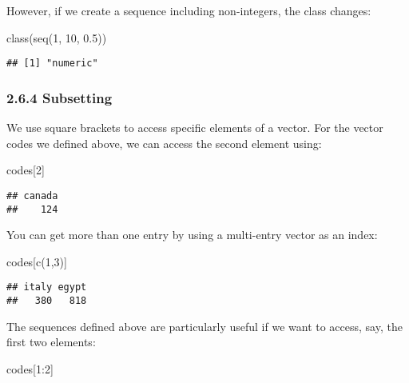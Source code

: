 \documentclass[
]{article}
\newenvironment{Shaded}{\begin{snugshade}}{\end{snugshade}}
\newcommand{\DecValTok}[1]{\textcolor[rgb]{0.00,0.00,0.81}{#1}}
\newcommand{\FloatTok}[1]{\textcolor[rgb]{0.00,0.00,0.81}{#1}}
\newcommand{\FunctionTok}[1]{\textcolor[rgb]{0.00,0.00,0.00}{#1}}
\newcommand{\NormalTok}[1]{#1}
\newcommand{\SpecialCharTok}[1]{\textcolor[rgb]{0.00,0.00,0.00}{#1}}
\begin{document}
However, if we create a sequence including non-integers, the class
changes:

\begin{Shaded}
\begin{Highlighting}[]
\FunctionTok{class}\NormalTok{(}\FunctionTok{seq}\NormalTok{(}\DecValTok{1}\NormalTok{, }\DecValTok{10}\NormalTok{, }\FloatTok{0.5}\NormalTok{))}
\end{Highlighting}
\end{Shaded}

\begin{verbatim}
## [1] "numeric"
\end{verbatim}

\hypertarget{subsetting}{%
\subsubsection{2.6.4 Subsetting}\label{subsetting}}

We use square brackets to access specific elements of a vector. For the
vector codes we defined above, we can access the second element using:

\begin{Shaded}
\begin{Highlighting}[]
\NormalTok{codes[}\DecValTok{2}\NormalTok{]}
\end{Highlighting}
\end{Shaded}

\begin{verbatim}
## canada 
##    124
\end{verbatim}

You can get more than one entry by using a multi-entry vector as an
index:

\begin{Shaded}
\begin{Highlighting}[]
\NormalTok{codes[}\FunctionTok{c}\NormalTok{(}\DecValTok{1}\NormalTok{,}\DecValTok{3}\NormalTok{)]}
\end{Highlighting}
\end{Shaded}

\begin{verbatim}
## italy egypt 
##   380   818
\end{verbatim}

The sequences defined above are particularly useful if we want to
access, say, the first two elements:

\begin{Shaded}
\begin{Highlighting}[]
\NormalTok{codes[}\DecValTok{1}\SpecialCharTok{:}\DecValTok{2}\NormalTok{]}
\end{Highlighting}
\end{Shaded}
\end{document}
